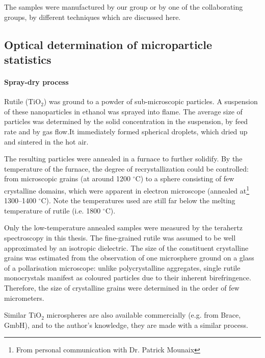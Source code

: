 The samples were manufactured by our group or by one of the collaborating groups, by different techniques which are discussed here. 
\subsection{Optical determination of microparticle statistics}
\paragraph{Spray-dry process}%
Rutile (TiO$_{2}$) was ground to a powder of sub-microscopic particles. 
A suspension of these nanoparticles in ethanol was sprayed into flame. The average size of particles was determined by the solid concentration in the suspension, by feed rate and by gas flow.It immediately formed spherical droplets, which dried up and sintered in the hot air.  

The resulting particles were annealed in a furnace to further solidify. By the temperature of the furnace, the degree of recrystallization could be controlled: from microscopic grains (at around 1200  $^{\circ}$C) to a sphere consisting of few crystalline domains, which were apparent in electron microscope (annealed at\footnote{From personal communication with Dr. Patrick Mounaix} 1300--1400 $^{\circ}$C). Note the temperatures used are still far below the melting temperature of rutile (i.e. 1800 $^{\circ}$C).

Only the low-temperature annealed samples were measured by the terahertz spectroscopy in this thesis. The fine-grained rutile was assumed to be well approximated by an isotropic dielectric. The size of the constituent crystalline grains was estimated from the observation of one microsphere ground on a glass of a pollarisation microscope: unlike polycrystalline aggregates, single rutile monocrystals manifest as coloured particles due to their inherent birefringence. Therefore, the size of crystalline grains were determined in the order of few micrometers.

Similar TiO$_{2}$ microspheres are also available commercially (e.g. from Brace, GmbH), and to the author's knowledge, they are made with a similar process.
